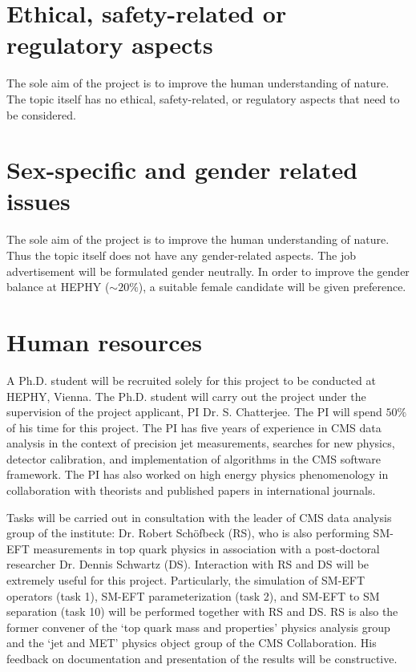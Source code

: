 \documentclass[a4paper,11pt]{article}
\begin{document}
\section{Ethical, safety-related or regulatory aspects}

The sole aim of the project is to improve the human understanding of nature. 
The topic itself has no ethical, safety-related, or regulatory aspects that need to be considered.

\section{Sex-specific and gender related issues}

The sole aim of the project is to improve the human understanding of nature. 
Thus the topic itself does not have any gender-related aspects. 
The job advertisement will be formulated gender neutrally. 
In order to improve the gender balance at HEPHY
($\sim 20\%$), a suitable female candidate will be given preference.

\section{Human resources}

A Ph.D. student will be recruited solely for this project to be conducted at HEPHY, Vienna. 
The Ph.D. student will carry out the project under the supervision of the project applicant, PI Dr. S. Chatterjee. 
The PI will spend $50\%$ of his time for this project. 
The PI has five years of experience in CMS data analysis in the context of precision jet measurements, searches for new physics, detector calibration, and implementation of algorithms in the CMS software framework. 
The PI has also worked on high energy physics phenomenology in collaboration with theorists and published papers in international journals. 

Tasks will be carried out in consultation with the leader of CMS data analysis group of the institute: Dr. Robert Sch{\"o}fbeck (RS), who is also performing SM-EFT measurements in top quark physics in association with a post-doctoral researcher Dr. Dennis Schwartz (DS). Interaction with RS and DS will be extremely useful for this project. 
Particularly, the simulation of SM-EFT operators (task 1), SM-EFT parameterization (task 2), and SM-EFT to SM separation (task 10) will be performed together with RS and DS. 
RS is also the former convener of the `top quark mass and properties' physics analysis group and the `jet and MET' physics object group of the CMS Collaboration. 
His feedback on documentation and presentation of the results will be constructive. 
\end{document}
